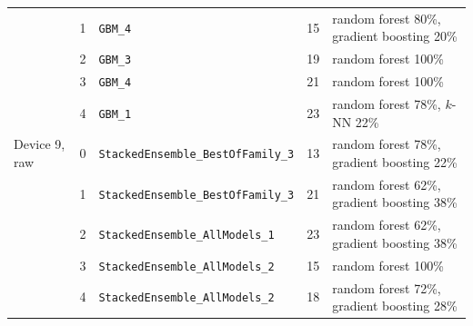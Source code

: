 \begin{table}[t]
\begin{tabular}{@{}llp{2.1in}cp{1.9in}@{}}
 & 1 & \texttt{GBM\_4} & 15 & random forest 80\%, gradient boosting 20\% \\
 & 2 & \texttt{GBM\_3} & 19 & random forest 100\% \\
 & 3 & \texttt{GBM\_4} & 21 & random forest 100\% \\
 & 4 & \texttt{GBM\_1} & 23 & random forest 78\%, $k$-NN 22\% \\
\midrule
Device 9, raw & 0 & \texttt{StackedEnsemble\_BestOfFamily\_3} & 13 & random forest 78\%, gradient boosting 22\% \\
 & 1 & \texttt{StackedEnsemble\_BestOfFamily\_3} & 21 & random forest 62\%, gradient boosting 38\% \\
 & 2 & \texttt{StackedEnsemble\_AllModels\_1} & 23 & random forest 62\%, gradient boosting 38\% \\
 & 3 & \texttt{StackedEnsemble\_AllModels\_2} & 15 & random forest 100\% \\
 & 4 & \texttt{StackedEnsemble\_AllModels\_2} & 18 & random forest 72\%, gradient boosting 28\% \\
\bottomrule
\end{tabular}
\end{table}

